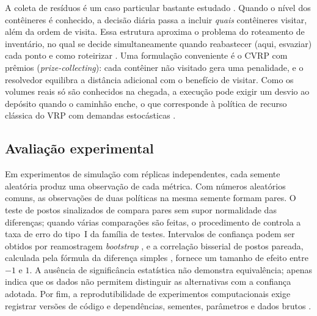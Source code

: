 A coleta de resíduos é um caso particular bastante estudado
\cite{belien2014municipal,han2015waste,hess2024waste}. Quando o nível dos
contêineres é conhecido, a decisão diária passa a incluir \emph{quais}
contêineres visitar, além da ordem de visita. Essa estrutura aproxima o
problema do roteamento de inventário, no qual se decide simultaneamente quando
reabastecer (aqui, esvaziar) cada ponto e como roteirizar \cite{mes2014inventory}.
Uma formulação conveniente é o CVRP com prêmios (\emph{prize-collecting}): cada
contêiner não visitado gera uma penalidade, e o resolvedor equilibra a
distância adicional com o benefício de visitar. Como os volumes reais só são
conhecidos na chegada, a execução pode exigir um desvio ao depósito quando o
caminhão enche, o que corresponde à política de recurso clássica do VRP com
demandas estocásticas \cite{dror1989vehicle}.

\subsection{Avaliação experimental}

Em experimentos de simulação com réplicas independentes, cada semente aleatória
produz uma observação de cada métrica. Com números aleatórios comuns, as
observações de duas políticas na mesma semente formam pares. O teste de postos
sinalizados de \cite{wilcoxon1945individual} compara pares sem supor
normalidade das diferenças; quando várias comparações são feitas, o
procedimento de \cite{holm1979simple} controla a taxa de erro do tipo~I da
família de testes. Intervalos de confiança podem ser obtidos por reamostragem
\emph{bootstrap} \cite{efron1979bootstrap,efron1993introduction}, e a correlação
bisserial de postos pareada, calculada pela fórmula da diferença simples
\cite{kerby2014simple}, fornece um tamanho de efeito entre $-1$ e $1$. A
ausência de significância estatística não demonstra equivalência; apenas indica
que os dados não permitem distinguir as alternativas com a confiança adotada.
Por fim, a reprodutibilidade de experimentos computacionais exige registrar
versões de código e dependências, sementes, parâmetros e dados brutos
\cite{sandve2013ten,peng2011reproducible}.
